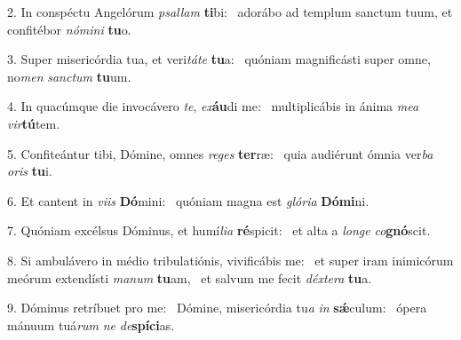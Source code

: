 2. In conspéctu Angelórum \textit{psal}\textit{lam} \textbf{ti}bi: \ast\  adorábo ad templum sanctum tuum, et confitébor \textit{nó}\textit{mi}\textit{ni} \textbf{tu}o.\

3. Super misericórdia tua, et veri\textit{tá}\textit{te} \textbf{tu}a: \ast\  quóniam magnificásti super omne, no\textit{men} \textit{sanc}\textit{tum} \textbf{tu}um.\

4. In quacúmque die invocávero \textit{te}, \textit{ex}\textbf{áu}di me: \ast\  multiplicábis in ánima \textit{me}\textit{a} \textit{vir}\textbf{tú}tem.\

5. Confiteántur tibi, Dómine, omnes \textit{re}\textit{ges} \textbf{ter}ræ: \ast\  quia audiérunt ómnia ver\textit{ba} \textit{o}\textit{ris} \textbf{tu}i.\

6. Et cantent in \textit{vi}\textit{is} \textbf{Dó}mini: \ast\  quóniam magna est \textit{gló}\textit{ri}\textit{a} \textbf{Dó}\textbf{mi}ni.\

7. Quóniam excélsus Dóminus, et humí\textit{li}\textit{a} \textbf{ré}spicit: \ast\  et alta a \textit{lon}\textit{ge} \textit{co}\textbf{gnó}scit.\

8. Si ambulávero in médio tribulatiónis, vivificábis me: \dag\  et super iram inimicórum meórum extendísti \textit{ma}\textit{num} \textbf{tu}am, \ast\  et salvum me fecit \textit{déx}\textit{te}\textit{ra} \textbf{tu}a.\

9. Dóminus retríbuet pro me: \dag\  Dómine, misericórdia tu\textit{a} \textit{in} \textbf{sǽ}culum: \ast\  ópera mánuum tuá\textit{rum} \textit{ne} \textit{de}\textbf{spí}\textbf{ci}as.\

